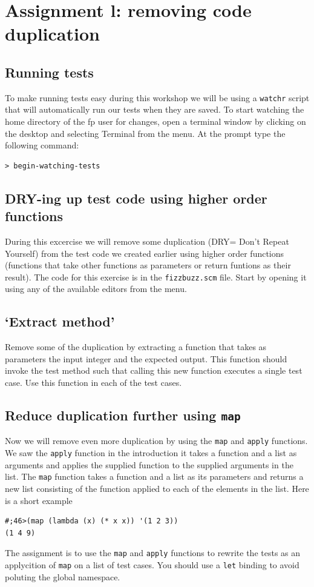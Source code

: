 \documentclass[12pt,a4paper,english,twoside]{article}
\begin{document}
\section{Assignment l: removing code duplication}
\subsection{Running tests}
To make running tests easy during this workshop we will be using a 
\texttt{watchr} script that will automatically run our tests when they are 
saved. To start watching the home directory of the fp user for changes, open a 
terminal window by clicking on the desktop and selecting Terminal from the 
menu.  At the prompt type the following command:
\begin{lstlisting}
> begin-watching-tests
\end{lstlisting}
\subsection{DRY-ing up test code using higher order functions}
During this excercise we will remove some duplication (DRY= Don't Repeat 
Yourself) from the test code we created earlier using higher order functions 
(functions that take other functions as parameters or return funtions as their 
result). The code for this exercise is in the \texttt{fizzbuzz.scm} file.  
Start by opening it using any of the available editors from the menu.  
\subsection{`Extract method'}
Remove some of the duplication by extracting a function that takes as 
parameters the input integer and the expected output. This function should 
invoke the test method such that calling this new function executes a single 
test case. Use this function in each of the test cases.
\subsection{Reduce duplication further using \texttt{map}}
Now we will remove even more duplication by using the \texttt{map} and 
\texttt{apply} functions. We saw the \texttt{apply} function in the 
introduction it takes a function and a list as arguments and applies the 
supplied function to the supplied arguments in the list. The \texttt{map} 
function takes a function and a list as its parameters and returns a new list 
consisting of the function applied to each of the elements in the list.
Here is a short example
\begin{lstlisting}
#;46>(map (lambda (x) (* x x)) '(1 2 3))
(1 4 9)
\end{lstlisting}
The assignment is to use the \texttt{map} and \texttt{apply} functions to 
rewrite the tests as an applycition of \texttt{map} on a list of test cases.
You should use a \texttt{let} binding to avoid poluting the global namespace.
\end{document}
